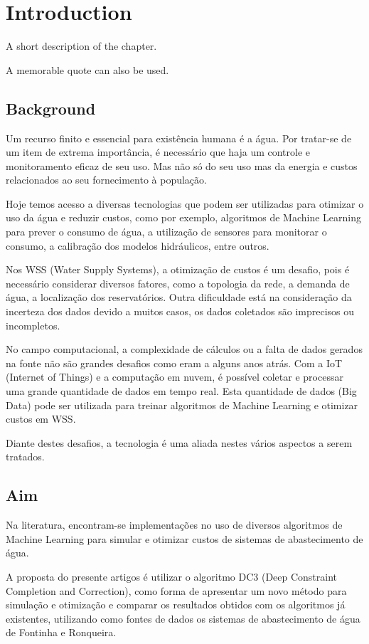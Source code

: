 \chapter{Introduction}%

\begin{introduction}
A short description of the chapter.

A memorable quote can also be used.
\end{introduction}



\section{Background}
Um recurso finito e essencial para existência humana é a água. Por tratar-se de um item de extrema importância, é necessário que haja um controle e monitoramento eficaz de seu uso. Mas não só do seu uso mas da energia e custos relacionados ao seu fornecimento à população.

Hoje temos acesso a diversas tecnologias que podem ser utilizadas para otimizar o uso da água e reduzir custos, como por exemplo, algoritmos de Machine Learning para prever o consumo de água, a utilização de sensores para monitorar o consumo, a calibração dos modelos hidráulicos, entre outros.

Nos WSS (Water Supply Systems), a otimização de custos é um desafio, pois é necessário considerar diversos fatores, como a topologia da rede, a demanda de água, a localização dos reservatórios. Outra dificuldade está na consideração da incerteza dos dados devido a muitos casos, os dados coletados são imprecisos ou incompletos.

No campo computacional, a complexidade de cálculos ou a falta de dados gerados na fonte não são grandes desafios como eram a alguns anos atrás. Com a IoT (Internet of Things) e a computação em nuvem, é possível coletar e processar uma grande quantidade de dados em tempo real. Esta quantidade de dados (Big Data) pode ser utilizada para treinar algoritmos de Machine Learning e otimizar custos em WSS. 

Diante destes desafios, a tecnologia é uma aliada nestes vários aspectos a serem tratados. 

\section{Aim}

Na literatura, encontram-se implementações no uso de diversos algoritmos de Machine Learning para simular e otimizar custos de sistemas de abastecimento de água.

A proposta do presente artigos é utilizar o algoritmo DC3 (Deep Constraint Completion and Correction), como forma de apresentar um novo método para simulação e otimização e comparar os resultados obtidos com os algoritmos já existentes, utilizando como fontes de dados os sistemas de abastecimento de água de Fontinha e Ronqueira.